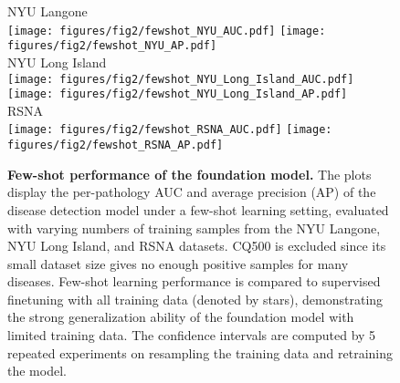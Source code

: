 \begin{figure}[htbp]
    \centering
    NYU Langone \\
    \texttt{[image: figures/fig2/fewshot\_NYU\_AUC.pdf]}
    \texttt{[image: figures/fig2/fewshot\_NYU\_AP.pdf]} \\
    NYU Long Island \\
    \texttt{[image: figures/fig2/fewshot\_NYU\_Long\_Island\_AUC.pdf]}
    \texttt{[image: figures/fig2/fewshot\_NYU\_Long\_Island\_AP.pdf]} \\
    RSNA \\
    \texttt{[image: figures/fig2/fewshot\_RSNA\_AUC.pdf]}
    \texttt{[image: figures/fig2/fewshot\_RSNA\_AP.pdf]}
    \caption{\textbf{Few-shot performance of the foundation model.}  The plots display the per-pathology AUC and average precision (AP) of the disease detection model under a few-shot learning setting, evaluated with varying numbers of training samples from the NYU Langone, NYU Long Island, and RSNA datasets. CQ500 is excluded since its small dataset size gives no enough positive samples for many diseases. Few-shot learning performance is compared to supervised finetuning with all training data (denoted by stars), demonstrating the strong generalization ability of the foundation model with limited training data. The confidence intervals are computed by 5 repeated experiments on resampling the training data and retraining the model.}
    \label{fig:fewshot}
\end{figure}
